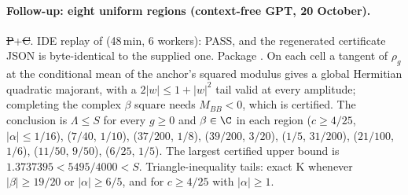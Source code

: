 \paragraph{Follow-up: eight uniform regions (context-free GPT, 20 October).} \st{P}+\st{C}. IDE replay of  (48\,min, 6 workers): PASS, and the regenerated
certificate JSON is byte-identical to the supplied one. Package . On each cell a tangent of $\rho_g$ at the conditional
mean of the anchor's squared modulus gives a global Hermitian quadratic majorant, with a $2|w|\le1+|w|^2$ tail valid at every amplitude; completing the complex $\beta$ square
needs $M_{BB}<0$, which is certified. The conclusion is $\Lambda\le S$ for every $g\ge0$ and $\beta\in\C$ in each region ($c\ge4/25$, $|\alpha|\le1/16$), ($7/40$, $1/10$), ($37/200$, $1/8$),
($39/200$, $3/20$), ($1/5$, $31/200$), ($21/100$, $1/6$), ($11/50$, $9/50$), ($6/25$, $1/5$). The largest certified upper bound is $1.3737395<5495/4000<S$. Triangle-inequality tails:
exact K whenever $|\beta|\ge19/20$ or $|\alpha|\ge6/5$, and for $c\ge4/25$ with $|\alpha|\ge1$.

